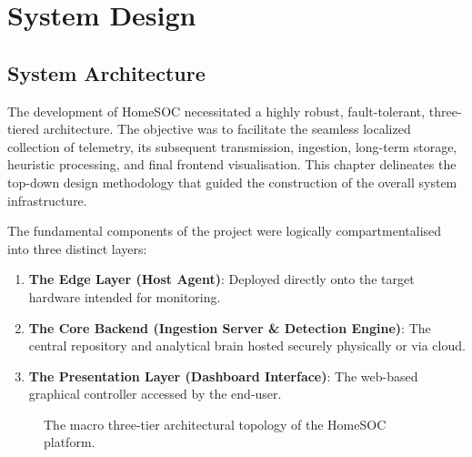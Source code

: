 \chapter{System Design}

\section{System Architecture}
The development of HomeSOC necessitated a highly robust, fault-tolerant, three-tiered architecture. The objective was to facilitate the seamless localized collection of telemetry, its subsequent transmission, ingestion, long-term storage, heuristic processing, and final frontend visualisation. This chapter delineates the top-down design methodology that guided the construction of the overall system infrastructure. 

The fundamental components of the project were logically compartmentalised into three distinct layers:
\begin{enumerate}
    \item \textbf{The Edge Layer (Host Agent)}: Deployed directly onto the target hardware intended for monitoring.
    \item \textbf{The Core Backend (Ingestion Server \& Detection Engine)}: The central repository and analytical brain hosted securely physically or via cloud.
    \item \textbf{The Presentation Layer (Dashboard Interface)}: The web-based graphical controller accessed by the end-user.
\end{enumerate}

\begin{figure}[h]
    \centering
    \caption{The macro three-tier architectural topology of the HomeSOC platform.}
    \label{fig:macro_arch}
\end{figure}

